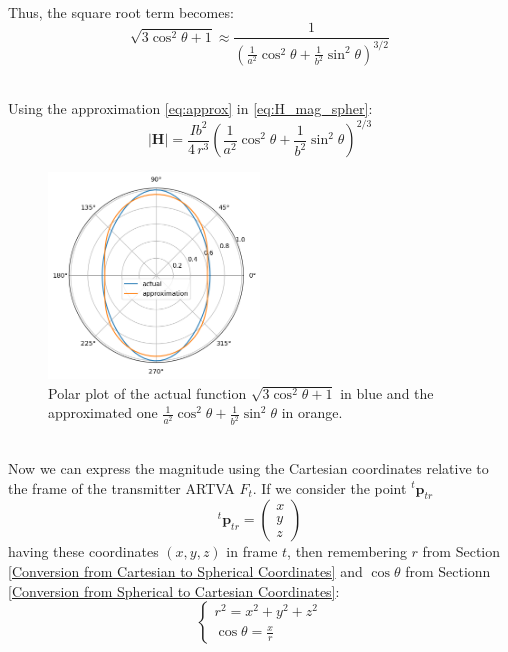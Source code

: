 \documentclass[main]{subfiles}
\begin{document}
\noindent\\
Thus, the square root term becomes:
\begin{equation}
    \sqrt{ 3 \cos^2 \theta + 1} \approx \frac{1}{\left(\frac{1}{a^2} \cos^2 \theta + \frac{1}{b^2} \sin^2 \theta\right)^{3/2}}
    \label{eq:approx}
\end{equation}

\noindent\\
Using the approximation \eqref{eq:approx} in \eqref{eq:H_mag_spher}:
\begin{equation}
    \left| \mathbf{H} \right| = \frac{I b^2}{4 \, r^3} \left(\frac{1}{a^2} \cos^2 \theta + \frac{1}{b^2} \sin^2 \theta\right)^{2/3}
    \label{eq:H_mag_approx}
\end{equation}

\begin{figure}
\centering
\includegraphics[width=0.5\textwidth]{images/polar_plot.png}
\caption{Polar plot of the actual function $\sqrt{ 3 \cos^2 \theta + 1} $ in blue 
and the approximated one $\frac{1}{a^2 }\cos^2 \theta + \frac{1}{b^2} \sin^2 \theta$ in orange.}
\label{fig:polarplot}
\end{figure}

\noindent\\
Now we can express the magnitude using the Cartesian coordinates relative to the frame of the transmitter ARTVA $F_t$. 
If we consider the point ${}^t \mathbf{p}_{tr}$\[
    {}^t \mathbf{p}_{tr} = \begin{pmatrix}
    x \\
    y \\
    z
\end{pmatrix}
\] having these coordinates $(x,y,z)$ in frame $t$, then remembering $r$ from Section \ref{Conversion from Cartesian to Spherical Coordinates} and $\cos\theta$ from Sectionn \ref{Conversion from Spherical to Cartesian Coordinates}:
\[
\begin{cases}
r^2 = x^2 + y^2 + z^2 \\
\cos\theta = \frac{x}{r}
\end{cases}
\]
\end{document}
